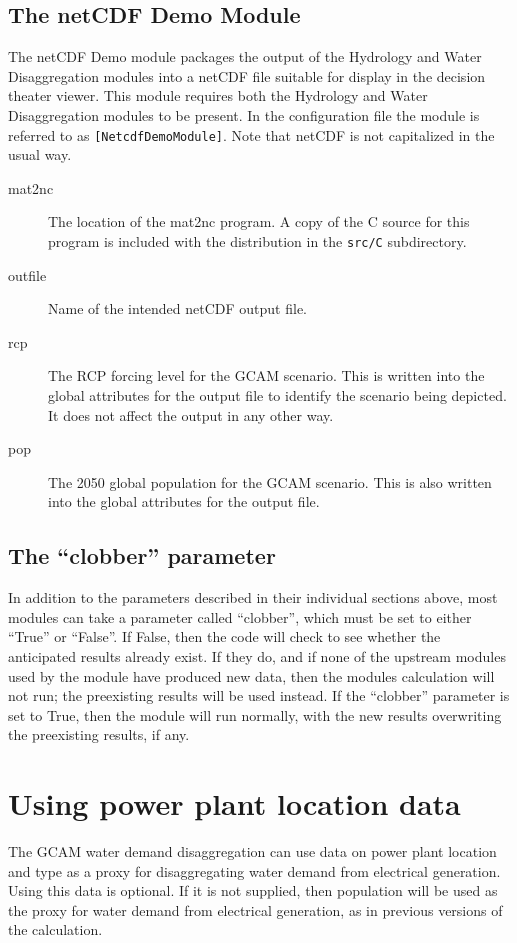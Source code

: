 \documentclass[11pt]{article}
\begin{document}
\subsection{The netCDF Demo Module}
The netCDF Demo module packages the output of the Hydrology and Water
Disaggregation modules into a netCDF file suitable for display in the
decision theater viewer.  This module requires both the Hydrology and
Water Disaggregation modules to be present.  In the configuration file
the module is referred to as \texttt{[NetcdfDemoModule]}.  Note that
netCDF is not capitalized in the usual way.

\begin{description}
\item[mat2nc] The location of the mat2nc program.  A copy of the C
  source for this program is included with the distribution in the
  \texttt{src/C} subdirectory.
\item[outfile] Name of the intended netCDF output file.
\item[rcp] The RCP forcing level for the GCAM scenario.  This is
  written into the global attributes for the output file to identify
  the scenario being depicted.  It does not affect the output in any
  other way.
\item[pop] The 2050 global population for the GCAM scenario.  This is
  also written into the global attributes for the output file.
\end{description}

\subsection{The ``clobber'' parameter}
In addition to the parameters described in their individual sections
above, most modules can take a parameter called ``clobber'', which
must be set to either ``True'' or ``False''.  If False, then the code
will check to see whether the anticipated results already exist.  If
they do, and if none of the upstream modules used by the module have
produced new data, then the modules calculation will not run; the
preexisting results will be used instead.  If the ``clobber''
parameter is set to True, then the module will run normally, with the
new results overwriting the preexisting results, if any.

\section{Using power plant location data}
\label{sec:pplant}
The GCAM water demand disaggregation can use data on power plant
location and type as a proxy for disaggregating water demand from
electrical generation.  Using this data is optional.  If it is not
supplied, then population will be used as the proxy for water demand
from electrical generation, as in previous versions of the
calculation.
\end{document}
